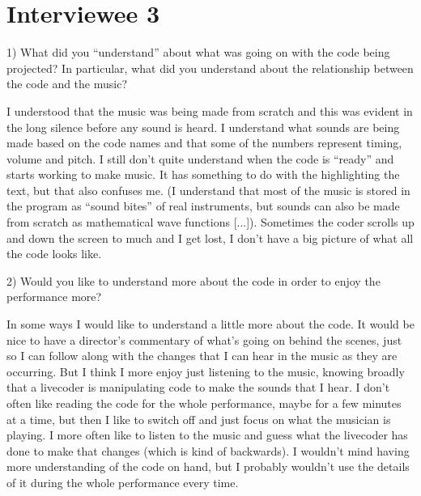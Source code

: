 \section*{Interviewee 3}

1) What did you ``understand'' about what was going on with the code being projected? In particular, what did you understand about the relationship between the code and the music?

I understood that the music was being made from scratch and this was evident in the long silence before any sound is heard. I understand what sounds are being made based on the code names and that some of the numbers represent timing, volume and pitch.  I still don't quite understand when the code is ``ready'' and starts working to make music. It has something to do with the highlighting the text, but that also confuses me. (I understand that most of the music is stored in the program as ``sound bites'' of real instruments, but sounds can also be made from scratch as mathematical wave functions [...]). Sometimes the coder scrolls up and down the screen to much and I get lost, I don't have a big picture of what all the code looks like.

2) Would you like to understand more about the code in order to enjoy the performance more?

In some ways I would like to understand a little more about the code. It would be nice to have a director's commentary of what's going on behind the scenes, just so I can follow along with the changes that I can hear in the music as they are occurring. But I think I more enjoy just listening to the music, knowing broadly that a livecoder is manipulating code to make the sounds that I hear. I don't often like reading the code for the whole performance, maybe for a few minutes at a time, but then I like to switch off and just focus on what the musician is playing. I more often like to listen to the music and guess what the livecoder has done to make that changes (which is kind of backwards). I wouldn't mind having more understanding of the code on hand, but I probably wouldn't use the details of it during the whole performance every time.
